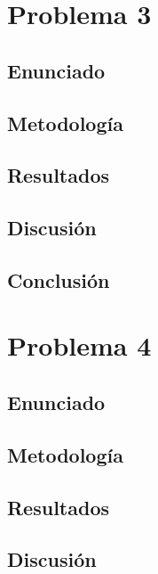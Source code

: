 \documentclass{article}
\begin{document}
\section{Problema 3}

\subsection{Enunciado}

\subsection{Metodología}

\subsection{Resultados}
\setcounter{equation}{0}

\subsection{Discusión}

\subsection{Conclusión}

\section{Problema 4}

\subsection{Enunciado}

\subsection{Metodología}

\subsection{Resultados}
\setcounter{equation}{0}

\subsection{Discusión}
\end{document}
